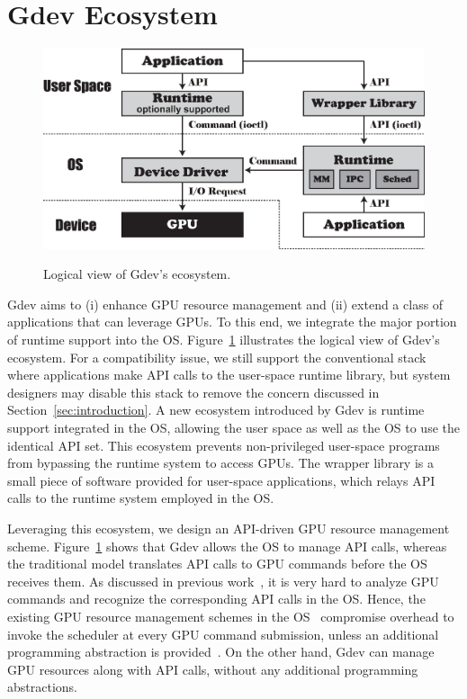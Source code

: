\vspace{-0.25em}
\section{Gdev Ecosystem}
\label{sec:ecosystem}
\vspace{-0.25em}

\begin{figure}[t]
 \begin{center}
  \includegraphics[width=\hsize]{eps/gdev.eps}\\
  \vspace{-0.5em}
  \caption{Logical view of Gdev's ecosystem.}
  \label{fig:gdev}
 \end{center}
 \vspace{-1.5em}
\end{figure}

Gdev aims to (i) enhance GPU resource management and (ii) extend a class
of applications that can leverage GPUs.
To this end, we integrate the major portion of runtime support into the OS.
Figure~\ref{fig:gdev} illustrates the logical view of Gdev's ecosystem.
For a compatibility issue, we still support the conventional stack where
applications make API calls to the user-space runtime library, but
system designers may disable this stack to remove the concern discussed in
Section~\ref{sec:introduction}.
A new ecosystem introduced by Gdev is runtime support integrated in
the OS, allowing the user space as well as the OS to use the identical
API set.
This ecosystem prevents non-privileged user-space programs from
bypassing the runtime system to access GPUs.
The wrapper library is a small piece of software provided for user-space
applications, which relays API calls to the runtime system employed in the OS.

Leveraging this ecosystem, we design an API-driven GPU resource
management scheme.
Figure~\ref{fig:gdev} shows that Gdev allows the OS to manage
API calls, whereas the traditional model translates API calls to GPU
commands before the OS receives them.
As discussed in previous work~\cite{Kato_ATC11}, it is very hard to
analyze GPU commands and recognize the corresponding API calls in the
OS.
Hence, the existing GPU resource management schemes in the
OS~\cite{Bautin_MCNC08, Kato_ATC11} compromise overhead to invoke the
scheduler at every GPU command submission, unless an additional
programming abstraction is provided~\cite{Rossbach_SOSP11}.
On the other hand, Gdev can manage GPU resources along with API calls,
without any additional programming abstractions.


